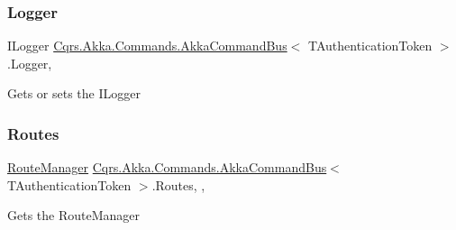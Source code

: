 \subsubsection{\texorpdfstring{Logger}{Logger}}
{\footnotesize\ttfamily I\+Logger \hyperlink{classCqrs_1_1Akka_1_1Commands_1_1AkkaCommandBus}{Cqrs.\+Akka.\+Commands.\+Akka\+Command\+Bus}$<$ T\+Authentication\+Token $>$.Logger\hspace{0.3cm}{\ttfamily [get]}, {\ttfamily [protected]}}



Gets or sets the I\+Logger 

\mbox{\label{classCqrs_1_1Akka_1_1Commands_1_1AkkaCommandBus_a93ddefb347d0cbc4f869c6d0866c8c64_a93ddefb347d0cbc4f869c6d0866c8c64}} 
\subsubsection{\texorpdfstring{Routes}{Routes}}
{\footnotesize\ttfamily \hyperlink{classCqrs_1_1Bus_1_1RouteManager}{Route\+Manager} \hyperlink{classCqrs_1_1Akka_1_1Commands_1_1AkkaCommandBus}{Cqrs.\+Akka.\+Commands.\+Akka\+Command\+Bus}$<$ T\+Authentication\+Token $>$.Routes\hspace{0.3cm}{\ttfamily [static]}, {\ttfamily [get]}, {\ttfamily [protected]}}



Gets the Route\+Manager 

